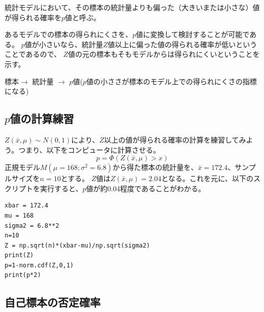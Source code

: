 \begin{defi}
    統計モデルにおいて、その標本の統計量よりも偏った（大きいまたは小さな）値が得られる確率を$p$値と呼ぶ。
\end{defi}

あるモデルでの標本の得られにくさを、$p$値に変換して検討することが可能である。
$p$値が小さいなら、統計量$Z$値以上に偏った値の得られる確率が低いということであるので、
$Z$値の元の標本もそもモデルからは得られにくいということを示す。

\begin{center}
    標本$\rightarrow$ 統計量 $\rightarrow$ $p$値($p$値の小ささが標本のモデル上での得られにくさの指標になる)
\end{center}
\fi




\subsection{$p$値の計算練習}
$Z(\bar{x},\mu)\sim N(0,1)$により、$Z$以上の値が得られる確率の計算を練習してみよう。つまり、以下をコンピュータに計算させる。
\begin{equation*}
    p = \varPhi(Z(\bar{x},\mu)>x)
\end{equation*}
正規モデル$M(\mu=168;\sigma^2=6.8)$から得た標本の統計量を、$\bar{x}=172.4$、サンプルサイズを$n=10$とする。
$Z$値は$Z(\bar{x},\mu)=2.04$となる。これを元に、以下のスクリプトを実行すると、$p$値が約0.04程度であることがわかる。

\begin{lstlisting}
xbar = 172.4
mu = 168
sigma2 = 6.8**2
n=10
Z = np.sqrt(n)*(xbar-mu)/np.sqrt(sigma2)
print(Z)
p=1-norm.cdf(Z,0,1)
print(p*2)
\end{lstlisting}



\subsection{自己標本の否定確率}


